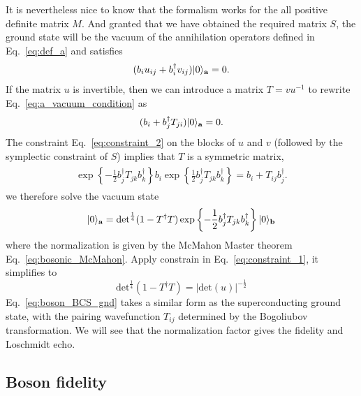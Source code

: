 It is nevertheless nice to know that the formalism works for the all positive definite matrix $M$. And granted that we have obtained the required matrix $S$, the ground state will be the vacuum of the annihilation operators defined in Eq.~\eqref{eq:def_a} and satisfies
\begin{eqnarray}\begin{aligned}
\label{eq:a_vacuum_condition}
(b_iu_{ij}+b_i^\dagger v_{ij})|0\rangle_{{\bf a}}=0.
\end{aligned}\end{eqnarray}
If the matrix $u$ is invertible, then we can introduce a matrix $T=vu^{-1}$ to rewrite Eq.~\eqref{eq:a_vacuum_condition} as
\begin{eqnarray}\begin{aligned}
(b_i+b_j^\dagger T_{ji})|0\rangle_{{\bf a}}=0. 
\end{aligned}\end{eqnarray}
The constraint Eq.~\eqref{eq:constraint_2} on the blocks of $u$ and $v$ (followed by the symplectic constraint of $S$) implies that $T$ is a symmetric matrix, 
\begin{eqnarray}\begin{aligned}
\exp\left\{-\frac{1}{2}b_j^\dagger T_{jk}b_k^\dagger\right\}b_i\exp\left\{\frac{1}{2}b_j^\dagger T_{jk}b_k^\dagger\right\}=b_i+T_{ij}b^\dagger_j.
\end{aligned}\end{eqnarray}
we therefore solve the vacuum state
\begin{eqnarray}\begin{aligned}
\label{eq:boson_BCS_gnd}
|0\rangle_{{\bf a}}&=\text{det}^{\frac{1}{4}}(1-T^\dagger T)\exp\left\{-\frac{1}{2}b_j^\dagger T_{jk}b_k^\dagger\right\}|0\rangle_{\bf b}\\
\end{aligned}\end{eqnarray}
where the normalization is given by the McMahon Master theorem Eq.~\ref{eq:bosonic_McMahon}. Apply constrain in Eq.~\eqref{eq:constraint_1}, it simplifies to
\begin{equation}
\text{det}^{\frac{1}{4}}(1-T^\dagger T) =|\text{det}(u)|^{-\frac{1}{2}}
\end{equation}
Eq.~\eqref{eq:boson_BCS_gnd} takes a similar form as the superconducting ground state, with the pairing wavefunction $T_{ij}$ determined by the Bogoliubov transformation. We will see that the normalization factor gives the fidelity and Loschmidt echo.

\subsection{Boson fidelity} 
\label{app_sub:boson_fidelity}

